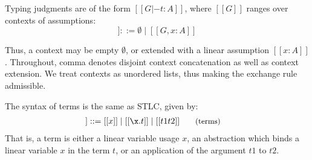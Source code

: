 

Typing judgments are of the form $[[ G |- t : A ]]$, where $[[ G ]]$ ranges over
contexts of assumptions:
\begin{equation*}
  [[ G ]] ::= \emptyset
  \mid [[ G , x : A ]]
\tag{contexts}
\end{equation*}

Thus, a context may be empty $\emptyset$, or extended with a linear assumption $[[
x : A ]]$. Throughout, comma denotes disjoint context concatenation as well as 
context extension. We treat contexts as unordered lists, thus making the exchange 
rule admissible. 

The syntax of terms is the same as STLC, given by:
\begin{align*}
  [[ t ]] ::= \;
         & [[ x ]]
    \mid [[ \x . t ]]
    \mid [[ t1 t2 ]]
  {\small{\tag{terms}}}
\end{align*}
That is, a term is either a linear variable usage $x$, an abstraction which binds a
linear variable $x$ in the term $t$, or an application of the argument $t1$ to $t2$. 

